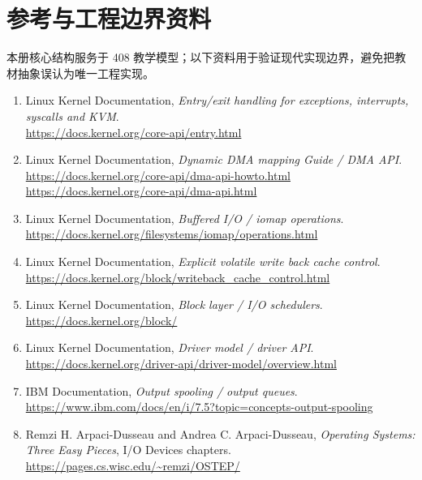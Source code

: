 \documentclass[11pt,a4paper]{ctexart}
\begin{document}
\section*{参考与工程边界资料}
本册核心结构服务于 408 教学模型；以下资料用于验证现代实现边界，避免把教材抽象误认为唯一工程实现。
\begin{enumerate}
  \item Linux Kernel Documentation, \emph{Entry/exit handling for exceptions, interrupts, syscalls and KVM}.\\
  \url{https://docs.kernel.org/core-api/entry.html}
  \item Linux Kernel Documentation, \emph{Dynamic DMA mapping Guide / DMA API}.\\
  \url{https://docs.kernel.org/core-api/dma-api-howto.html}\\
  \url{https://docs.kernel.org/core-api/dma-api.html}
  \item Linux Kernel Documentation, \emph{Buffered I/O / iomap operations}.\\
  \url{https://docs.kernel.org/filesystems/iomap/operations.html}
  \item Linux Kernel Documentation, \emph{Explicit volatile write back cache control}.\\
  \url{https://docs.kernel.org/block/writeback_cache_control.html}
  \item Linux Kernel Documentation, \emph{Block layer / I/O schedulers}.\\
  \url{https://docs.kernel.org/block/}
  \item Linux Kernel Documentation, \emph{Driver model / driver API}.\\
  \url{https://docs.kernel.org/driver-api/driver-model/overview.html}
  \item IBM Documentation, \emph{Output spooling / output queues}.\\
  \url{https://www.ibm.com/docs/en/i/7.5?topic=concepts-output-spooling}
  \item Remzi H. Arpaci-Dusseau and Andrea C. Arpaci-Dusseau, \emph{Operating Systems: Three Easy Pieces}, I/O Devices chapters.\\
  \url{https://pages.cs.wisc.edu/~remzi/OSTEP/}
\end{enumerate}
\end{document}
